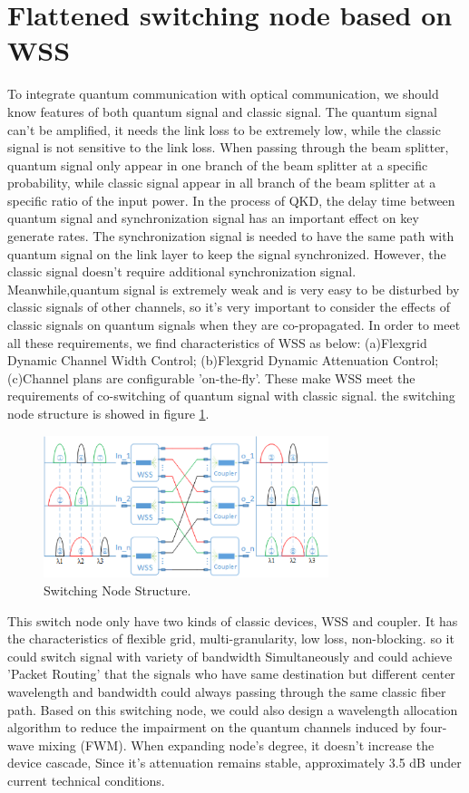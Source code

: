 \documentclass[letterpaper,10pt]{article}
\begin{document}
\section{Flattened switching node based on WSS}

To integrate quantum communication with optical communication, we should know features of both quantum signal and classic signal. The quantum signal can't be amplified, it needs the link loss to be extremely low, while the classic signal is not sensitive to the link loss. When passing through the beam splitter, quantum signal only appear in one branch of the beam splitter at a specific probability, while classic signal appear in all branch of the beam splitter at a specific ratio of the input power. In the process of QKD, the delay time between quantum signal and synchronization signal has an important effect on key generate rates. The synchronization signal is needed to have the same path with quantum signal on the link layer to keep the signal synchronized. However, the classic signal doesn't require additional synchronization signal. Meanwhile,quantum signal is extremely weak and is very easy to be disturbed by classic signals of other channels, so it's very important to consider the effects of classic signals on quantum signals when they are co-propagated. In order to meet all these requirements, we find characteristics of WSS as below: (a)Flexgrid Dynamic Channel Width Control; (b)Flexgrid Dynamic Attenuation Control; (c)Channel plans are configurable 'on-the-fly'. These make WSS meet the requirements of co-switching of quantum signal with classic signal. the switching node structure is showed in figure \ref{Fig:switching_node_structure}.
\begin{figure}[htbp]
  \centering
  \includegraphics[width=8.3cm]{swtiching_node_struct}
  \caption{Switching Node Structure.} \label{Fig:switching_node_structure}
\end{figure}
This switch node only have two kinds of classic devices, WSS and coupler. It has the characteristics of flexible grid, multi-granularity, low loss, non-blocking. so it could switch signal with variety of bandwidth Simultaneously and could achieve 'Packet Routing' that the signals who have same destination but different center wavelength and bandwidth could always passing through the same classic fiber path. Based on this switching node, we could also design a wavelength allocation algorithm to reduce the impairment on the quantum channels induced by four-wave mixing (FWM). When expanding node's degree, it doesn't increase the device cascade, Since it's attenuation remains stable, approximately 3.5 dB under current technical conditions.
\end{document}
